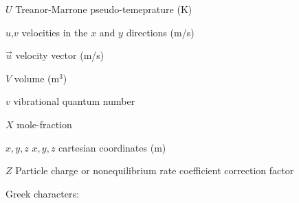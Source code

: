 \begin{list}{}{%
\setlength{\labelwidth}{35mm}
\setlength{\leftmargin}{45mm}}
 \item[$U$\dotfill] Treanor-Marrone pseudo-temeprature (K)
 \item[$u$,$v$\dotfill] velocities in the $x$ and $y$ directions (m/s)
 \item[$\vec{u}$\dotfill] velocity vector (m/s)
 \item[$V$\dotfill] volume (m$^3$)
 \item[$v$\dotfill] vibrational quantum number
 \item[$X$\dotfill] mole-fraction
 \item[$x,y,z$\dotfill] $x,y,z$ cartesian coordinates (m)
 \item[$Z$\dotfill] Particle charge or nonequilibrium rate coefficient correction factor
\end{list}

\medskip

Greek characters:

\par

